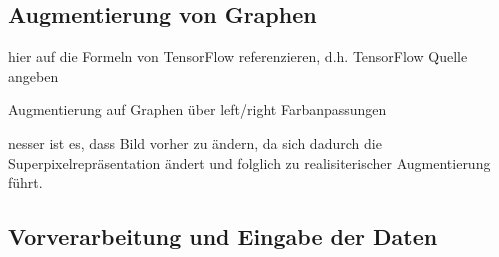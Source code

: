 \subsection{Augmentierung von Graphen}
\label{augmentierung_von_graphen}

hier auf die Formeln von TensorFlow referenzieren, d.h. TensorFlow Quelle angeben
\cite{tensorflow}

Augmentierung auf Graphen über left/right
Farbanpassungen


nesser ist es, dass Bild vorher zu ändern, da sich dadurch die Superpixelrepräsentation ändert
und folglich zu realisiterischer Augmentierung führt.

\subsection{Vorverarbeitung und Eingabe der Daten}
\label{vorverarbeitung}
